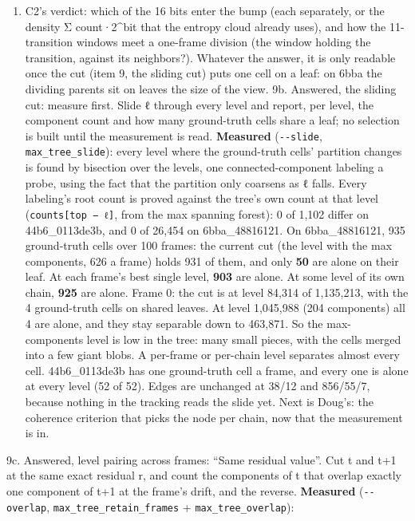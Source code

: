 \begin{enumerate}
\item C2's verdict: which of the 16 bits enter the bump (each separately, or the density Σ count·2\textasciicircum{}bit that the entropy cloud already uses), and how the 11-transition windows meet a one-frame division (the window holding the transition, against its neighbors?). Whatever the answer, it is only readable once the cut (item 9, the sliding cut) puts one cell on a leaf: on 6bba the dividing parents sit on leaves the size of the view. 9b. Answered, the sliding cut: measure first. Slide ℓ through every level and report, per level, the component count and how many ground-truth cells share a leaf; no selection is built until the measurement is read. \textbf{Measured} (\texttt{-\allowbreak{}-\allowbreak{}slide}, \texttt{max\_\allowbreak{}tree\_\allowbreak{}slide}): every level where the ground-truth cells' partition changes is found by bisection over the levels, one connected-component labeling a probe, using the fact that the partition only coarsens as ℓ falls. Every labeling's root count is proved against the tree's own count at that level (\texttt{counts[top − ℓ]}, from the max spanning forest): 0 of 1,102 differ on 44b6\_\allowbreak{}0113de3b, and 0 of 26,454 on 6bba\_\allowbreak{}48816121. On 6bba\_\allowbreak{}48816121, 935 ground-truth cells over 100 frames: the current cut (the level with the max components, 626 a frame) holds 931 of them, and only \textbf{50} are alone on their leaf. At each frame's best single level, \textbf{903} are alone. At some level of its own chain, \textbf{925} are alone. Frame 0: the cut is at level 84,314 of 1,135,213, with the 4 ground-truth cells on shared leaves. At level 1,045,988 (204 components) all 4 are alone, and they stay separable down to 463,871. So the max-components level is low in the tree: many small pieces, with the cells merged into a few giant blobs. A per-frame or per-chain level separates almost every cell. 44b6\_\allowbreak{}0113de3b has one ground-truth cell a frame, and every one is alone at every level (52 of 52). Edges are unchanged at 38/12 and 856/55/7, because nothing in the tracking reads the slide yet. Next is Doug's: the coherence criterion that picks the node per chain, now that the measurement is in.
\end{enumerate}

9c. Answered, level pairing across frames: “Same residual value”. Cut t and t+1 at the same exact residual r, and count the components of t that overlap exactly one component of t+1 at the frame's drift, and the reverse. \textbf{Measured} (\texttt{-\allowbreak{}-\allowbreak{}overlap}, \texttt{max\_\allowbreak{}tree\_\allowbreak{}retain\_\allowbreak{}frames} + \texttt{max\_\allowbreak{}tree\_\allowbreak{}overlap}):

